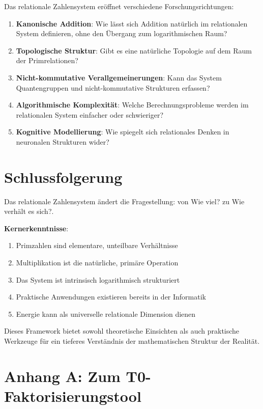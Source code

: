 	Das relationale Zahlensystem eröffnet verschiedene Forschungsrichtungen:
	
	\begin{enumerate}
		\item \textbf{Kanonische Addition}: Wie lässt sich Addition natürlich im relationalen System definieren, ohne den Übergang zum logarithmischen Raum?
		\item \textbf{Topologische Struktur}: Gibt es eine natürliche Topologie auf dem Raum der Primrelationen?
		\item \textbf{Nicht-kommutative Verallgemeinerungen}: Kann das System Quantengruppen und nicht-kommutative Strukturen erfassen?
		\item \textbf{Algorithmische Komplexität}: Welche Berechnungsprobleme werden im relationalen System einfacher oder schwieriger?
		\item \textbf{Kognitive Modellierung}: Wie spiegelt sich relationales Denken in neuronalen Strukturen wider?
	\end{enumerate}
	
	\section{Schlussfolgerung}
	
	Das relationale Zahlensystem ändert die Fragestellung: von Wie viel? zu Wie verhält es sich?. 
	
	\textbf{Kernerkenntnisse}:
	\begin{enumerate}
		\item Primzahlen sind elementare, unteilbare Verhältnisse
		\item Multiplikation ist die natürliche, primäre Operation
		\item Das System ist intrinsisch logarithmisch strukturiert
		\item Praktische Anwendungen existieren bereits in der Informatik
		\item Energie kann als universelle relationale Dimension dienen
	\end{enumerate}
	
	Dieses Framework bietet sowohl theoretische Einsichten als auch praktische Werkzeuge für ein tieferes Verständnis der mathematischen Struktur der Realität.
	
	\section{Anhang A: Zum T0-Faktorisierungstool}
	
